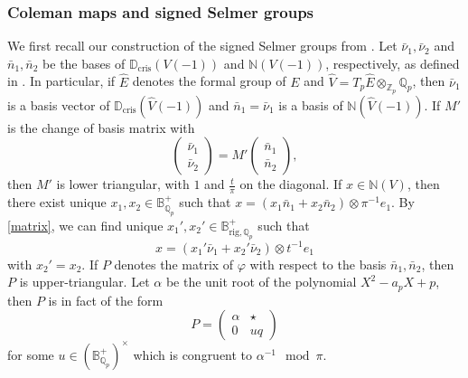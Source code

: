 \documentclass{amsart}
\newcommand{\QQ}{\mathbb Q}
\newcommand{\ZZ}{\mathbb Z}
\newcommand{\BB}{\mathbb B}
\newcommand{\DD}{\mathbb D}
\newcommand{\NN}{\mathbb N}
\newcommand{\Brig}{\BB^+_{\mathrm{rig},\QQ_p}}
\DeclareMathOperator{\cris}{cris}
\newcommand{\Qp}{\QQ_p}
\newcommand{\vp}{\varphi}
\begin{document}
   
   \subsubsection{Coleman maps and signed Selmer groups}
   
    We first recall our construction of the signed Selmer groups from \cite{leiloefflerzerbes10}. Let $\bar{\nu}_1,\bar{\nu}_2$ and $\bar{n}_1,\bar{n}_2$ be the bases of $\DD_{\cris}(V(-1))$ and $\NN(V(-1))$, respectively, as defined in \cite[\S 3.2]{leiloefflerzerbes10}. In particular, if $\hat{E}$ denotes the formal group of $E$ and $\hat{V}=T_p\hat{E}\otimes_{\ZZ_p}\QQ_p$, then $\bar{\nu}_1$ is a basis vector of $\DD_{\cris}(\hat{V}(-1))$ and $\bar{n}_1=\bar{\nu}_1$ is a basis of $\NN(\hat{V}(-1))$. If $M'$ is the change of basis matrix with 
    \begin{equation}\label{matrix}
      \begin{pmatrix}\bar{\nu}_1\\\bar{\nu}_2\end{pmatrix}=M'\begin{pmatrix}\bar{n}_1\\\bar{n}_2\end{pmatrix},
    \end{equation}
    then $M'$ is lower triangular, with $1$ and $\frac{t}{\pi}$ on the diagonal. If $x\in\NN(V)$, then there exist unique $x_1,x_2\in\BB_{\Qp}^+$ such that $x=(x_1\bar{n}_1+x_2\bar{n}_2)\otimes\pi^{-1}e_1$. By \eqref{matrix}, we can find unique $x_1',x_2'\in\Brig$ such that
    \begin{equation}\label{secondform}
     x=(x_1'\bar{\nu}_1+x_2'\bar{\nu}_2)\otimes t^{-1}e_1
    \end{equation}
    with $x_2'=x_2$. If $P$ denotes the matrix of $\vp$ with respect to the basis $\bar{n}_1,\bar{n}_2$, then $P$ is upper-triangular. Let $\alpha$ be the unit root of the polynomial $X^2-a_pX+p$, then $P$ is in fact of the form
    \[ P=\begin{pmatrix} \alpha & \star \\
         0 & uq
        \end{pmatrix}\]
    for some $u\in (\BB^+_{\QQ_p})^\times$ which is congruent to $\alpha^{-1}\mod \pi$.
\end{document}
